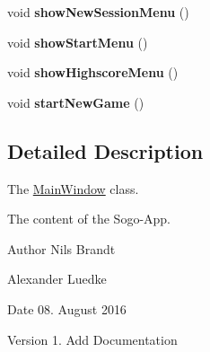 \begin{DoxyCompactItemize}
\item 
\hypertarget{classMainWindow_ac63b1d94f5cb0ad40b6ce651c8786b18}{void {\bfseries show\-New\-Session\-Menu} ()}\label{classMainWindow_ac63b1d94f5cb0ad40b6ce651c8786b18}

\item 
\hypertarget{classMainWindow_a63f8a7b5189797e75f175da1949a1e76}{void {\bfseries show\-Start\-Menu} ()}\label{classMainWindow_a63f8a7b5189797e75f175da1949a1e76}

\item 
\hypertarget{classMainWindow_a7d14a8a706385f2596c38b3e7c8d8fb0}{void {\bfseries show\-Highscore\-Menu} ()}\label{classMainWindow_a7d14a8a706385f2596c38b3e7c8d8fb0}

\item 
\hypertarget{classMainWindow_a4195422fe1346c1aa9c640715dfe73cb}{void {\bfseries start\-New\-Game} ()}\label{classMainWindow_a4195422fe1346c1aa9c640715dfe73cb}

\end{DoxyCompactItemize}


\subsection{Detailed Description}
The \hyperlink{classMainWindow}{Main\-Window} class. 

The content of the Sogo-\/\-App.

\begin{DoxyAuthor}{Author}
Nils Brandt 

Alexander Luedke
\end{DoxyAuthor}
\begin{DoxyDate}{Date}
08. August 2016
\end{DoxyDate}
\begin{DoxyVersion}{Version}
1. Add Documentation 
\end{DoxyVersion}
